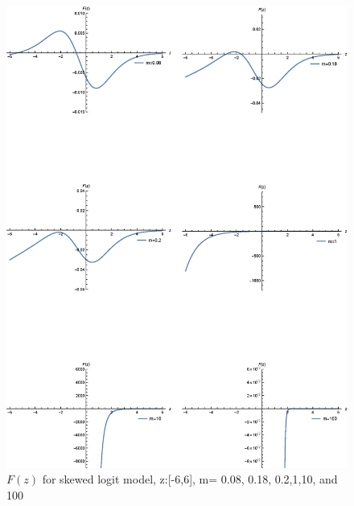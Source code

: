 \documentclass[12pt]{TD-CJS}
\begin{document}
\begin{figure}[ht]
    \centering
    \includegraphics[scale = 0.6]{fig3.eps}
\caption{$F(z)$ for skewed logit model, z:[-6,6], m= 0.08, 0.18, 0.2,1,10, and 100}
\label{fig:skewedlogit_after_F}
\end{figure}
\end{document}
